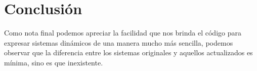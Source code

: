\documentclass[12pt, letterpaper]{article}
\begin{document}
\section*{Conclusión}

Como nota final podemos apreciar la facilidad que nos brinda el código para expresar sistemas dinámicos de una manera mucho más sencilla, podemos observar que la diferencia entre los sistemas originales y aquellos actualizados es mínima, sino es que inexistente. 
\renewcommand\refname{Referencias}
\printbibliography
\end{document}
